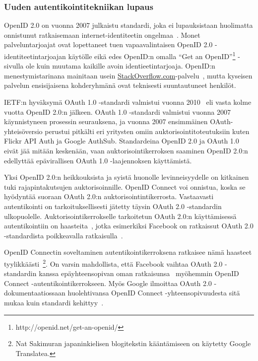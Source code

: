 \documentclass[finnish,gradu]{tktltiki}
\begin{document}
  \subsubsection{Uuden autentikointitekniikan lupaus} %
  \label{ssub:uuden_autentikointitekniikan_lupaus}

  OpenID 2.0 on vuonna 2007 julkaistu standardi, joka ei lupauksistaan huolimatta onnistunut ratkaisemaan internet-identiteetin ongelmaa~\cite{openid_failure_gilbertson_2011, openid_failure_obasanjo_2011, openid_failure_edge_2011, openid_failure_conery_2010, openid_failure_quora_2010, openid_failure_37signals_2011}. Monet palveluntarjoajat ovat lopettaneet tuen vapaavalintaisen OpenID 2.0 -identiteetintarjoajan käytölle eikä edes OpenID:n omalla ``Get an OpenID''\footnote{http://openid.net/get-an-openid/} -sivulla ole kuin muutama kaikille avoin identieetintarjoaja. OpenID:n menestymistarinana mainitaan usein \url{StackOverflow.com}-palvelu~\cite{openid_success_stackoverflow_2010, openid_failure_conery_2010}, mutta kyseisen palvelun ensisijaisena kohderyhmänä ovat teknisesti suuntautuneet henkilöt.

  IETF:n hyväksymä OAuth 1.0 -standardi valmistui vuonna 2010~\cite{ietf_oauth1} eli vasta kolme vuotta OpenID 2.0:n jälkeen. OAuth 1.0 -standardi valmistui vuonna 2007 käynnistyneen prosessin seurauksena, ja vuonna 2007 ensimmäinen OAuth-yhteisöversio perustui pitkälti eri yritysten omiin auktorisointitoteutuksiin kuten Flickr API Auth ja Google AuthSub. Standardeina OpenID 2.0 ja OAuth 1.0 eivät jää mitään keskenään, vaan auktorisointikerroksen saaminen OpenID 2.0:n edellyttää epävirallisen OAuth 1.0 -laajennoksen käyttämistä.

  Yksi OpenID 2.0:n heikkouksista ja syistä huonolle levinneisyydelle on kitkainen tuki rajapintakutsujen auktorisoinnille. OpenID Connect voi onnistua, koska se hyödyntää suoraan OAuth 2.0:n auktorisointintikerrosta. Vastaavasti autentikointi on tarkoituksellisesti jätetty täysin OAuth 2.0 -standardin ulkopuolelle. Auktorisointikerrokselle tarkoitetun OAuth 2.0:n käyttämisessä autentikointiin on haasteita~\cite{bradley_oauth_authentication_problem_2012, bradley_oauth_implicit_flow_vulnerability_2012}, jotka esimerkiksi Facebook on ratkaissut OAuth 2.0 -standardista poikkeavalla ratkaisulla~\cite{bradley_facebook_id_tokens_2012, facebook_oauth2_signed_request}.

  OpenID Connectin soveltaminen autentikointikerroksena ratkaisee nämä haasteet tyylikkäästi~\cite{bradley_openid_c_id_token_2012, bradley_facebook_for_authentication_2012 sakimura_oauth_authentication_problem_2012}\footnote{Nat Sakimuran japaninkielisen blogitekstin kääntämiseen on käytetty Google Translatea.}. On varsin mahdollista, että Facebook vaihtaa OAuth 2.0 -standardin kanssa epäyhteensopivan oman ratkaisunsa~\cite{bradley_facebook_id_tokens_2012, facebook_oauth2_signed_request} myöhemmin OpenID Connect -autentikointikerrokseen. Myös Google ilmoittaa OAuth 2.0 -dokumentaatiossaan huolehtivansa OpenID Connect -yhteensopivuudesta sitä mukaa kuin standardi kehittyy~\cite{google_oauth2_login}.
\end{document}
